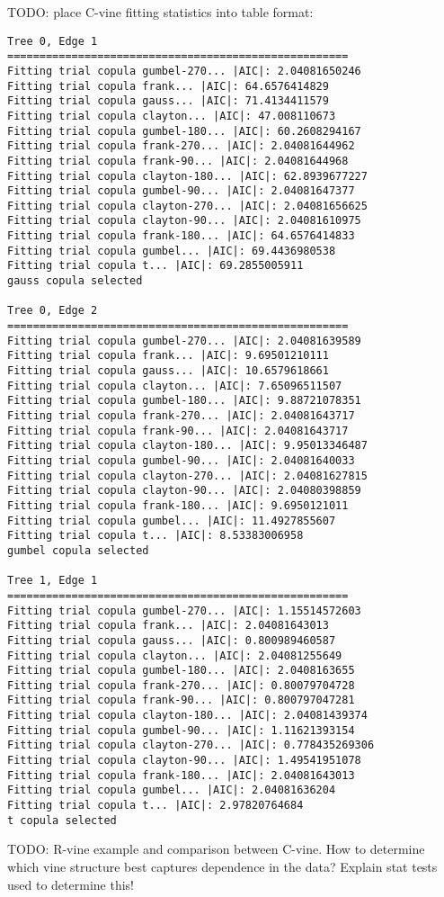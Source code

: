 \documentclass[10pt,a4paper]{report}
\begin{document}
TODO: place C-vine fitting statistics into table format:
\begin{verbatim}
Tree 0, Edge 1
=====================================================
Fitting trial copula gumbel-270... |AIC|: 2.04081650246
Fitting trial copula frank... |AIC|: 64.6576414829
Fitting trial copula gauss... |AIC|: 71.4134411579
Fitting trial copula clayton... |AIC|: 47.008110673
Fitting trial copula gumbel-180... |AIC|: 60.2608294167
Fitting trial copula frank-270... |AIC|: 2.04081644962
Fitting trial copula frank-90... |AIC|: 2.04081644968
Fitting trial copula clayton-180... |AIC|: 62.8939677227
Fitting trial copula gumbel-90... |AIC|: 2.04081647377
Fitting trial copula clayton-270... |AIC|: 2.04081656625
Fitting trial copula clayton-90... |AIC|: 2.04081610975
Fitting trial copula frank-180... |AIC|: 64.6576414833
Fitting trial copula gumbel... |AIC|: 69.4436980538
Fitting trial copula t... |AIC|: 69.2855005911
gauss copula selected

Tree 0, Edge 2
=====================================================
Fitting trial copula gumbel-270... |AIC|: 2.04081639589
Fitting trial copula frank... |AIC|: 9.69501210111
Fitting trial copula gauss... |AIC|: 10.6579618661
Fitting trial copula clayton... |AIC|: 7.65096511507
Fitting trial copula gumbel-180... |AIC|: 9.88721078351
Fitting trial copula frank-270... |AIC|: 2.04081643717
Fitting trial copula frank-90... |AIC|: 2.04081643717
Fitting trial copula clayton-180... |AIC|: 9.95013346487
Fitting trial copula gumbel-90... |AIC|: 2.04081640033
Fitting trial copula clayton-270... |AIC|: 2.04081627815
Fitting trial copula clayton-90... |AIC|: 2.04080398859
Fitting trial copula frank-180... |AIC|: 9.6950121011
Fitting trial copula gumbel... |AIC|: 11.4927855607
Fitting trial copula t... |AIC|: 8.53383006958
gumbel copula selected

Tree 1, Edge 1
=====================================================
Fitting trial copula gumbel-270... |AIC|: 1.15514572603
Fitting trial copula frank... |AIC|: 2.04081643013
Fitting trial copula gauss... |AIC|: 0.800989460587
Fitting trial copula clayton... |AIC|: 2.04081255649
Fitting trial copula gumbel-180... |AIC|: 2.0408163655
Fitting trial copula frank-270... |AIC|: 0.80079704728
Fitting trial copula frank-90... |AIC|: 0.800797047281
Fitting trial copula clayton-180... |AIC|: 2.04081439374
Fitting trial copula gumbel-90... |AIC|: 1.11621393154
Fitting trial copula clayton-270... |AIC|: 0.778435269306
Fitting trial copula clayton-90... |AIC|: 1.49541951078
Fitting trial copula frank-180... |AIC|: 2.04081643013
Fitting trial copula gumbel... |AIC|: 2.04081636204
Fitting trial copula t... |AIC|: 2.97820764684
t copula selected
\end{verbatim}

TODO: R-vine example and comparison between C-vine.  How to determine which vine structure best captures dependence in the data?  Explain stat tests used to determine this!
\end{document}
